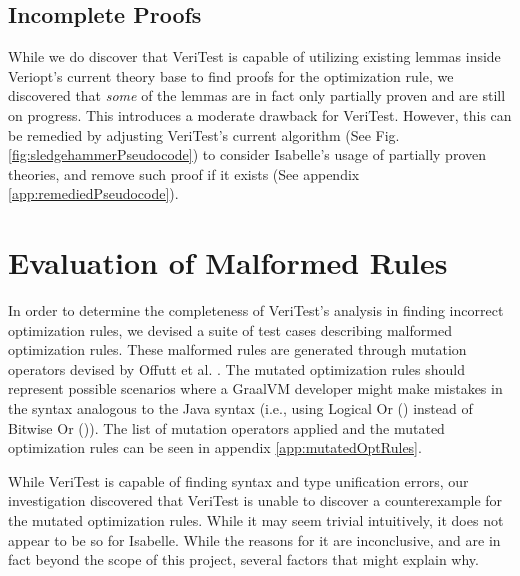 \subsection{Incomplete Proofs}

While we do discover that VeriTest is capable of utilizing existing lemmas inside Veriopt's current theory base to find proofs for the 
optimization rule, we discovered that \emph{some} of the lemmas are in fact only partially proven and are still on progress. 
This introduces a moderate drawback for VeriTest. However, this can be remedied by adjusting VeriTest's current algorithm 
(See Fig. \ref{fig:sledgehammerPseudocode}) to consider Isabelle's usage of partially proven theories, and remove such proof if it 
exists (See appendix \ref{app:remediedPseudocode}).






\section{Evaluation of Malformed Rules}

In order to determine the completeness of VeriTest's analysis in finding incorrect optimization rules, we devised a suite of test cases describing 
malformed optimization rules. These malformed rules are generated through mutation operators devised by Offutt et al. \cite{offutt_mutation_2006}.
The mutated optimization rules should represent possible scenarios where a GraalVM developer might make mistakes in the syntax analogous to 
the Java syntax (i.e., using Logical Or (\mono{||}) instead of Bitwise Or (\mono{|})). The list of mutation operators applied and the mutated 
optimization rules can be seen in appendix \ref{app:mutatedOptRules}.



While VeriTest is capable of finding syntax and type unification errors, our investigation discovered that VeriTest is unable to 
discover a counterexample for the mutated optimization rules. While it may seem trivial intuitively, it does not appear to be so for Isabelle. 
While the reasons for it are inconclusive, and are in fact beyond the scope of this project, several factors that might explain why.

